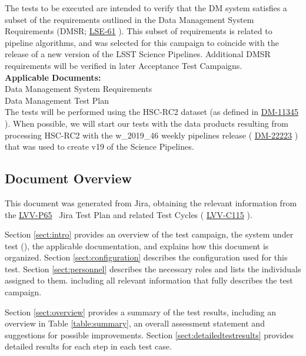 \documentclass[DM,lsstdraft,STR,toc]{lsstdoc}
\begin{document}
 The tests to be executed are intended to verify that the DM system
satisfies a subset of the requirements outlined in the Data Management
System Requirements (DMSR; \href{https://lse-61.lsst.io/}{LSE-61} ).
This subset of requirements is related to pipeline algorithms, and was
selected for this campaign to coincide with the release of a new version
of the LSST Science Pipelines. Additional DMSR requirements will be
verified in later Acceptance Test
Campaigns.\\[2\baselineskip]\textbf{Applicable
Documents:}\\[2\baselineskip] Data Management System
Requirements\\
 Data Management Test Plan\\[2\baselineskip]The tests will be
performed using the HSC-RC2 dataset (as defined in
\href{https://jira.lsstcorp.org/browse/DM-11345}{DM-11345} ). When
possible, we will start our tests with the data products resulting from
processing HSC-RC2 with the w\_2019\_46 weekly pipelines release (
\href{https://jira.lsstcorp.org/browse/DM-22223}{DM-22223} ) that was
used to create v19 of the Science Pipelines.~


\subsection{Document Overview}
\label{sect:docoverview}

This document was generated from Jira, obtaining the relevant information from the 
\href{https://jira.lsstcorp.org/secure/Tests.jspa#/testPlan/LVV-P65}{LVV-P65}
~Jira Test Plan and related Test Cycles (
  \href{https://jira.lsstcorp.org/secure/Tests.jspa#/testCycle/LVV-C115}{LVV-C115}
).

Section \ref{sect:intro} provides an overview of the test campaign, the system under test (\product{}),
the applicable documentation, and explains how this document is organized.
Section \ref{sect:configuration}  describes the configuration used for this test.
Section \ref{sect:personnel} describes the necessary roles and lists the individuals assigned to them.
including all relevant information that fully describes the test campaign.

Section \ref{sect:overview} provides a summary of the test results, including an overview in Table \ref{table:summary},
an overall assessment statement and suggestions for possible improvements.
Section \ref{sect:detailedtestresults} provides detailed results for each step in each test case.
\end{document}
